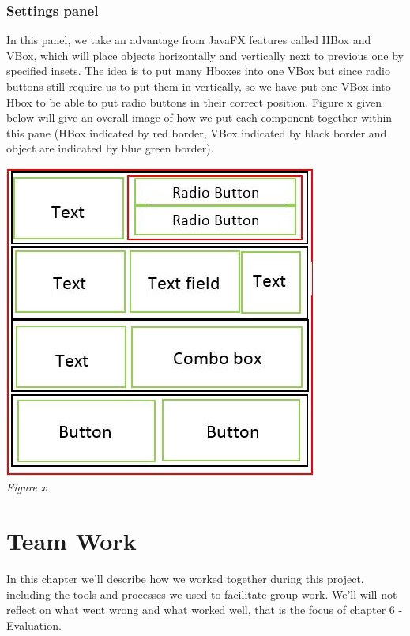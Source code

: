 \documentclass[11pt]{article}
\begin{document}
\subsubsection{Settings panel}
In this panel, we take an advantage from JavaFX features called HBox and VBox, which will place objects horizontally and vertically next to previous one by specified insets. The idea is to put many Hboxes into one VBox but since radio buttons still require us to put them in vertically, so we have put one VBox into Hbox to be able to put radio buttons in their correct position. Figure x given below will give an overall image of how we put each component together within this pane (HBox indicated by red border, VBox indicated by black border and object are indicated by blue green border).
\\
\begin{center}
\includegraphics{GUI_component}\\
\textit{Figure x}
\end{center}

\newpage
\section{Team Work}
In this chapter we'll describe how we worked together during this project, including the tools and processes we used to facilitate group work. We'll will not reflect on what went wrong and what worked well, that is the focus of chapter 6 - Evaluation.
\end{document}
